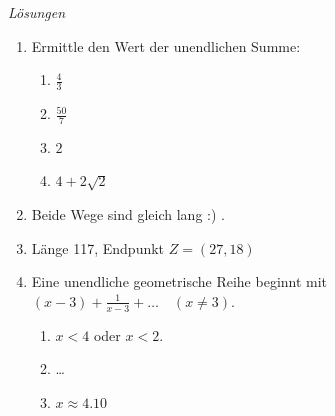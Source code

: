 \clearpage
\emph{Lösungen}
\begin{enumerate}
    \item Ermittle den Wert der unendlichen Summe: 
    \begin{enumerate}
        \item\(  \frac{4}{3}  \)
        \item \( \frac{50}{7} \)
        \item \( 2\)
        \item \( 4 + 2\sqrt{2} \)
    \end{enumerate}
    \item Beide Wege sind gleich lang :) .
    \item Länge 117, Endpunkt $Z=(27, 18)$
    
    \item Eine unendliche geometrische Reihe beginnt mit 
    \(
    (x - 3) + \frac{1}{x - 3} + \dots \quad (x \neq 3).
    \)
    
    \begin{enumerate}
        \item $x<4$ oder $x<2$.
        \item \dots
        \item \( x \approx 4.10\)
    \end{enumerate}
\end{enumerate}




























\newpage
